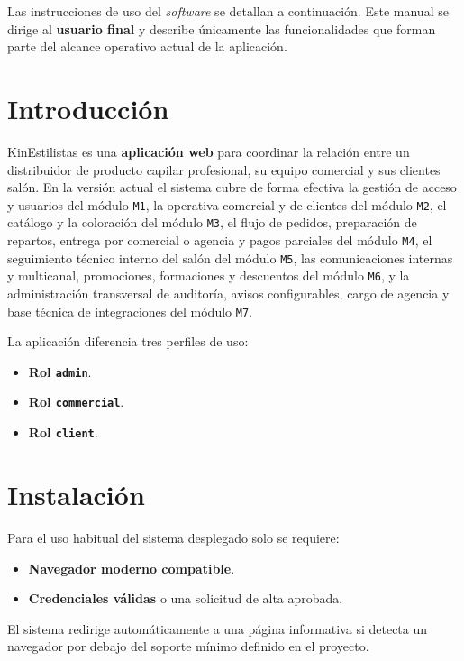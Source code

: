 Las instrucciones de uso del \textit{software} se detallan a continuación. Este manual se dirige al \textbf{usuario final} y describe únicamente las funcionalidades que forman parte del alcance operativo actual de la aplicación.

\section{Introducción}

KinEstilistas es una \textbf{aplicación web} para coordinar la relación entre un distribuidor de producto capilar profesional, su equipo comercial y sus clientes salón. En la versión actual el sistema cubre de forma efectiva la gestión de acceso y usuarios del módulo \texttt{M1}, la operativa comercial y de clientes del módulo \texttt{M2}, el catálogo y la coloración del módulo \texttt{M3}, el flujo de pedidos, preparación de repartos, entrega por comercial o agencia y pagos parciales del módulo \texttt{M4}, el seguimiento técnico interno del salón del módulo \texttt{M5}, las comunicaciones internas y multicanal, promociones, formaciones y descuentos del módulo \texttt{M6}, y la administración transversal de auditoría, avisos configurables, cargo de agencia y base técnica de integraciones del módulo \texttt{M7}.

La aplicación diferencia tres perfiles de uso:

\begin{itemize}
    \item \textbf{Rol \texttt{admin}}.
    \item \textbf{Rol \texttt{commercial}}.
    \item \textbf{Rol \texttt{client}}.
\end{itemize}

\section{Instalación}

Para el uso habitual del sistema desplegado solo se requiere:

\begin{itemize}
    \item \textbf{Navegador moderno compatible}.
    \item \textbf{Credenciales válidas} o una solicitud de alta aprobada.
\end{itemize}

El sistema redirige automáticamente a una página informativa si detecta un navegador por debajo del soporte mínimo definido en el proyecto.

